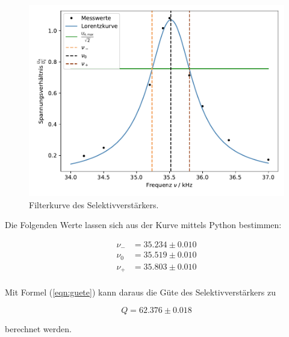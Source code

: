 \newpage
\begin{figure}
    \centering
       \includegraphics[width=\textwidth]{Daten/x7.pdf}
       \caption{Filterkurve des Selektivverstärkers.}
       \label{fig:guete}
\end{figure}

\noindent
Die Folgenden Werte lassen sich aus der Kurve mittels Python bestimmen: 

\begin{align*}
\nu_- &= 35.234 \pm 0.010 \\
\nu_0 &= 35.519 \pm 0.010 \\
\nu_+ &= 35.803 \pm 0.010 \\
\end{align*}

\noindent
Mit Formel (\ref{eqn:guete}) kann daraus die Güte des Selektivverstärkers zu 

\begin{equation*}
    Q = 62.376 \pm 0.018 
\end{equation*}

\noindent
berechnet werden.

